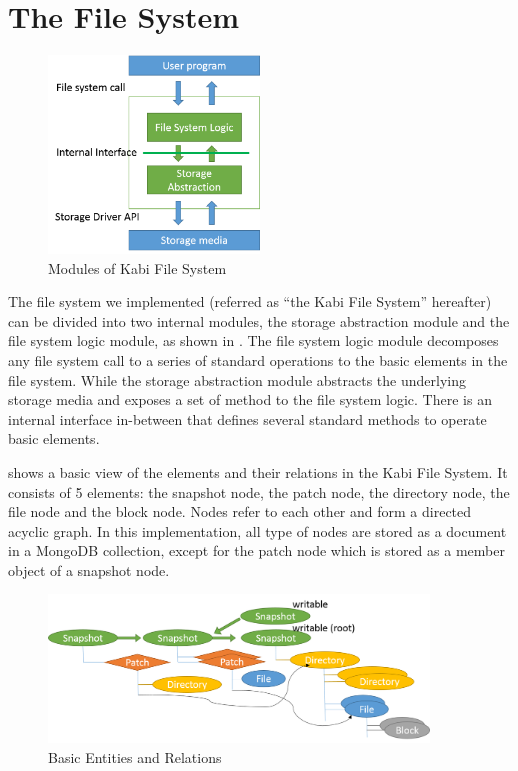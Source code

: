 \chapter{The File System}
\label{chap:fs}
\begin{figure}[hbtp]
\centering
\includegraphics[width=0.5\textwidth]{Chapter-3/figs/fig8.png}
\caption{Modules of Kabi File System}
\label{fig:modules}
\end{figure}

    The file system we implemented (referred as “the Kabi File System” hereafter) can be divided into two internal modules, the storage abstraction module and the file system logic module, as shown in . The file system logic module decomposes any file system call to a series of standard operations to the basic elements in the file system. While the storage abstraction module abstracts the underlying storage media and exposes a set of method to the file system logic. There is an internal interface in-between that defines several standard methods to operate basic elements. 

     shows a basic view of the elements and their relations in the Kabi File System. It consists of 5 elements: the snapshot node, the patch node, the directory node, the file node and the block node. Nodes refer to each other and form a directed acyclic graph. In this implementation, all type of nodes are stored as a document in a MongoDB collection, except for the patch node which is stored as a member object of a snapshot node. 
    
\begin{figure}[hbtp]
\centering
\includegraphics[width=0.9\textwidth]{Chapter-3/figs/fig2.png}
\caption{Basic Entities and Relations}
\label{fig:basic_entities}
\end{figure}

